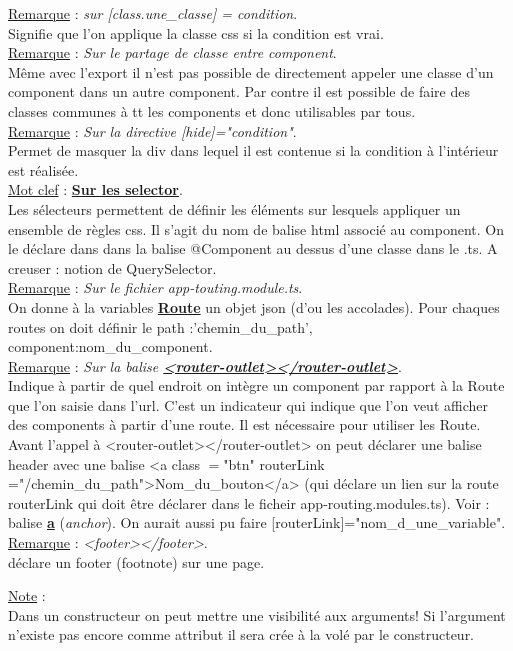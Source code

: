 \documentclass[a4paper,12pt,twoside]{article}
\newcommand{\urlcolor}{magenta}  %
\newcommand{\keycolor}{purple} %
\newcommand{\incode}[1]{{\footnotesize\ttfamily #1}} %
\newcommand{\rem}[2]{\noindent\underline{Remarque} : \textit{#1}.\\ \indent #2}
\newcommand{\note}[1]{\noindent\underline{Note} : \\ \indent #1}
\newcommand{\keyref}[2]{\hypersetup{urlcolor=\keycolor} \href{#1}{\textbf{#2}}\hypersetup{urlcolor=\urlcolor}}
\newcommand{\keyword}[3]{\noindent\underline{Mot clef} : \keyref{#1}{#2}. \\ \indent #3}
\begin{document}
\rem{sur [class.une\_classe] = condition}{Signifie que l'on applique la classe css si la condition est vrai.}\\

\rem{Sur le partage de classe entre component}{Même avec l'export il n'est pas possible de directement appeler une classe d'un component dans un autre component. Par contre il est possible de faire des classes communes à tt les components et donc utilisables par tous.}\\

\rem{Sur la directive [hide]="condition"}{Permet de masquer la div dans lequel il est contenue si la condition à l'intérieur est réalisée.}\\

\keyword{https://developer.mozilla.org/en-US/docs/Web/CSS/CSS_Selectors}{Sur les selector}{Les sélecteurs permettent de définir les éléments sur lesquels appliquer un ensemble de règles css. Il s'agit du nom de balise html associé au component. On le déclare dans dans la balise @Component au dessus d'une classe dans le .ts. A creuser : notion de QuerySelector.}\\

\rem{Sur le fichier app-touting.module.ts}{On donne à la variables \keyref{https://angular.io/api/router/Route}{Route} un objet json (d'ou les accolades). Pour chaques routes on doit définir le \incode{path :'chemin\_du\_path', component:nom\_du\_component}.}\\

\rem{Sur la balise \keyref{https://angular.io/api/router/RouterOutlet}{<router-outlet></router-outlet>}}{Indique à partir de quel endroit on intègre un component par rapport à la \incode{Route} que l'on saisie dans l'url. C'est un indicateur qui indique que l'on veut afficher des components à partir d'une route. Il est nécessaire pour utiliser les \incode{Route}. Avant l'appel à <router-outlet></router-outlet> on peut déclarer une balise header avec une balise <a class $=$"btn" routerLink ="/chemin\_du\_path">Nom\_du\_bouton</a> (qui déclare un lien sur la route routerLink qui doit être déclarer dans le ficheir app-routing.modules.ts). Voir : balise \keyref{https://developer.mozilla.org/fr/docs/Web/HTML/Element/a}{a} (\textit{anchor}). On aurait aussi pu faire [routerLink]="nom\_d\_une\_variable".}\\

\rem{<footer></footer>}{déclare un footer (footnote) sur une page.}

\note{Dans un constructeur on peut mettre une visibilité aux arguments! Si l'argument n'existe pas encore comme attribut il sera crée à la volé par le constructeur.}\\
\end{document}
